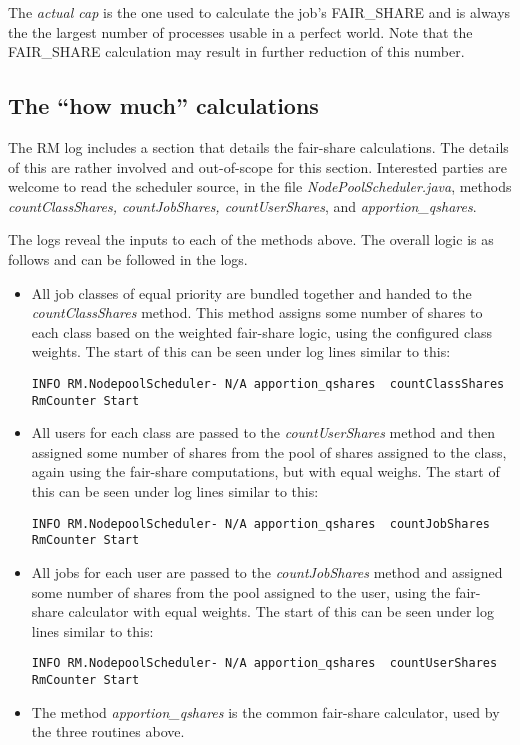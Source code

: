     The {\em actual cap} is the one used to calculate the job's FAIR\_SHARE and
    is always the the largest number of processes usable in a perfect world.  Note
    that the FAIR\_SHARE calculation may result in further reduction of this
    number.

\subsection{The ``how much'' calculations}
   The RM log includes a section that details the fair-share calculations.  The details
   of this are rather involved and out-of-scope for this section.  Interested parties
   are welcome to read the scheduler source, in the file {\em NodePoolScheduler.java},
   methods {\em countClassShares, countJobShares, countUserShares}, and {\em apportion\_qshares}.

   The logs reveal the inputs to each of the methods above.  The overall logic is as follows
   and can be followed in the logs.

   \begin{itemize}
     \item All job classes of equal priority are bundled together and handed to the
       {\em countClassShares} method.  This method assigns some number of shares
       to each class based on the weighted fair-share logic, using the configured
       class weights.  The start of this can be seen under log lines similar to this:
\begin{verbatim}
INFO RM.NodepoolScheduler- N/A apportion_qshares  countClassShares RmCounter Start
\end{verbatim}

     \item All users for each class are passed to the {\em countUserShares} method
       and then assigned some number of shares from the
       pool of shares assigned to the class, again
       using the fair-share computations, but with equal weighs.
       The start of this can be seen under log lines similar to this:
\begin{verbatim}
INFO RM.NodepoolScheduler- N/A apportion_qshares  countJobShares RmCounter Start
\end{verbatim}

     \item All jobs for each user are passed to the {\em countJobShares} method
       and assigned some number of shares from the pool assigned to the user, using
       the fair-share calculator with equal weights.
       The start of this can be seen under log lines similar to this:
\begin{verbatim}
INFO RM.NodepoolScheduler- N/A apportion_qshares  countUserShares RmCounter Start
\end{verbatim}

     \item The method {\em apportion\_qshares} is the common fair-share
       calculator, used by the three routines above.
   \end{itemize}

